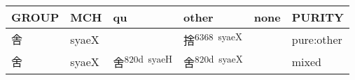 \documentclass[14pt,a4paper]{scrartcl}
\begin{document}
\begin{longtable}[c]{@{}llllll@{}}
\toprule
\begin{minipage}[b]{0.14\columnwidth}\raggedright\strut
GROUP
\strut\end{minipage} &
\begin{minipage}[b]{0.14\columnwidth}\raggedright\strut
MCH
\strut\end{minipage} &
\begin{minipage}[b]{0.14\columnwidth}\raggedright\strut
qu
\strut\end{minipage} &
\begin{minipage}[b]{0.14\columnwidth}\raggedright\strut
other
\strut\end{minipage} &
\begin{minipage}[b]{0.14\columnwidth}\raggedright\strut
none
\strut\end{minipage} &
\begin{minipage}[b]{0.14\columnwidth}\raggedright\strut
PURITY
\strut\end{minipage}\tabularnewline
\midrule
\endhead
\begin{minipage}[t]{0.14\columnwidth}\raggedright\strut
舎
\strut\end{minipage} &
\begin{minipage}[t]{0.14\columnwidth}\raggedright\strut
syaeX
\strut\end{minipage} &
\begin{minipage}[t]{0.14\columnwidth}\raggedright\strut
\strut\end{minipage} &
\begin{minipage}[t]{0.14\columnwidth}\raggedright\strut
捨\textsuperscript{6368~syaeX}
\strut\end{minipage} &
\begin{minipage}[t]{0.14\columnwidth}\raggedright\strut
\strut\end{minipage} &
\begin{minipage}[t]{0.14\columnwidth}\raggedright\strut
pure:other
\strut\end{minipage}\tabularnewline
\begin{minipage}[t]{0.14\columnwidth}\raggedright\strut
舍
\strut\end{minipage} &
\begin{minipage}[t]{0.14\columnwidth}\raggedright\strut
syaeX
\strut\end{minipage} &
\begin{minipage}[t]{0.14\columnwidth}\raggedright\strut
舍\textsuperscript{820d~syaeH}
\strut\end{minipage} &
\begin{minipage}[t]{0.14\columnwidth}\raggedright\strut
舍\textsuperscript{820d~syaeX}
\strut\end{minipage} &
\begin{minipage}[t]{0.14\columnwidth}\raggedright\strut
\strut\end{minipage} &
\begin{minipage}[t]{0.14\columnwidth}\raggedright\strut
mixed
\strut\end{minipage}\tabularnewline
\bottomrule
\end{longtable}
\end{document}
